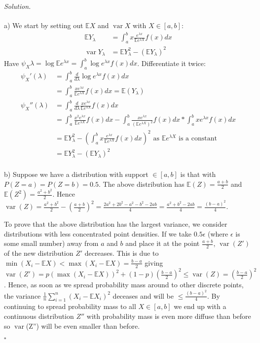 \documentclass[11pt]{article}
\newcommand{\E}{\ensuremath{\mathbb{E}}} %
\newcommand{\var}{\ensuremath{\operatorname{var}}} %
\newcommand{\logmgf}[1]{\ensuremath{\psi_{#1}}} %
\theoremstyle{definition}
\newenvironment{solution}{\noindent\emph{Solution.}}{\hfill$\square$}
\begin{document}
\begin{solution}
\\ \\a)  We start by setting out $\E X $ and $\var X$ with $X \in [a, b]$:
\begin{align*}
\E Y_\lambda  &= \int_{a}^{b} x \frac{e^{\lambda x}}{\E e^{\lambda X}} f(x) dx\\
\var Y_\lambda &= \E Y_\lambda^2  - (\E Y_\lambda)^2
\end{align*}
Have $\logmgf{X} \lambda = \log \E e^{\lambda x} = \int_{a}^{b} \log e^{\lambda x} f(x) dx$. Differentiate it twice:
\begin{align*}
\logmgf{X}'(\lambda) 
&= \int_{a}^{b} \frac{d}{d \lambda} \log e^{\lambda x} f(x) dx \\
&= \int_{a}^{b} \frac{xe^{\lambda x}}{\E e^{\lambda X}} f(x) dx = \E(Y_\lambda)\\
\logmgf{X}''(\lambda) 
&= \int_{a}^{b} \frac{d}{d \lambda} \frac{xe^{\lambda x}}{\E e^{\lambda X}} f(x) dx\\
&= \int_{a}^{b} \frac{x^2 e^{\lambda x}}{\E e^{\lambda X}} f(x) dx - \int_{a}^{b} \frac{xe^{\lambda x}}{(\E e^{\lambda X})^2} f(x) dx *\int_{a}^{b} xe^{\lambda x} f(x) dx \\
& = \E Y_\lambda^2 - (\int_{a}^{b} x \frac{e^{\lambda x}}{\E e^{\lambda X}} f(x) dx)^2 \textrm{ as } \E e^{\lambda X} \textrm{ is a constant}\\
&= \E Y_\lambda^2 - (\E Y_\lambda)^2
\end{align*}
\newline
\\ b) Suppose we have a distribution with support $\in [a, b]$ is that with $P(Z = a) = P(Z = b) = 0.5$. The above distribution has $\E(Z)  = \frac{a+b}{2}$ and $\E(Z^2) = \frac{a^2 + b^2}{2}$. Hence $\var(Z) = \frac{a^2 + b^2}{2} - (\frac{a+b}{2})^2 = \frac{2a^2 + 2b^2 - a^2 - b^2 - 2ab}{4} = \frac{a^2 + b^2 - 2ab}{4} = \frac{(b - a)^2 }{4}$. 

To prove that the above distribution has the largest variance, we consider distributions with less concentrated point densities. If we take $0.5 \epsilon$ (where $\epsilon$ is some small number) away from $a$ and $b$ and place it at the point $\frac{a + b}{2}$, \var$(Z')$ of the new distribution $Z'$ decreases. This is due to $\min(X_i - \E X)  < \max(X_i - \E X) = \frac{b-a}{2}$ giving $\var(Z') = p(\max(X_i - \E X))^2 + (1-p)(\frac{b-a}{2})^2 \leq \var(Z) = (\frac{b-a}{2})^2$. Hence, as soon as we spread probability mass around to other discrete points, the variance $\frac{1}{n} \sum_{i=1}^n (X_i - \E X_i)^2$ deceases and will be $\leq \frac{(b -a)^2}{4}$. By continuing to spread probability mass to all $X \in [a, b]$ we end up with a continuous distribution $Z''$ with probability mass is even more diffuse than before so \var(Z'') will be even smaller than before. 


\end{solution}
\end{document}
